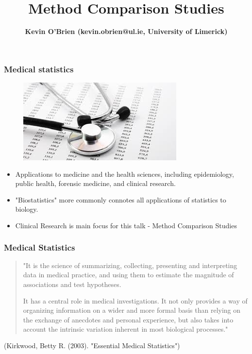 \documentclass[compress]{beamer}        %
\title
{
{\huge Method Comparison Studies \\[0.3cm] }
}
\author[Kevin O'Brien]{{\bf Kevin O'Brien (kevin.obrien@ul.ie, University of Limerick)}}
\institute[University of Limerick, Maths \& Stats Dept]{}
\date{}
\begin{document}
\begin{frame}
\vspace{-0.4cm}
\titlepage
\end{frame}


\begin{frame}
	\frametitle{Medical statistics }
	\large
	\begin{figure}
\centering
\includegraphics[width=0.4\linewidth]{medstats}
\end{figure}

	\begin{itemize}
		\item Applications to medicine and the health sciences, including epidemiology, public health, forensic medicine, and clinical research. 
		\item "Biostatistics" more commonly connotes all applications of statistics to biology.
		\item Clinical Research is main focus for this talk - Method Comparison Studies
	\end{itemize}
\end{frame}	
	
	\begin{frame}
		\frametitle{Medical Statistics}
		\large
		\begin{quote} 
			"It is the science of summarizing, collecting, presenting and interpreting data in medical practice, and using them to estimate the magnitude of associations 
			and test hypotheses. 
			
			
			It has a central role in medical investigations. It not only provides a way of organizing information on a wider and more formal basis than relying on the exchange of anecdotes and personal experience, but also takes 
			into account the intrinsic variation inherent in most biological processes." 
			
		\end{quote}
		(Kirkwood, Betty R. (2003). "Essential Medical Statistics")
	\end{frame}
	
\end{document}
